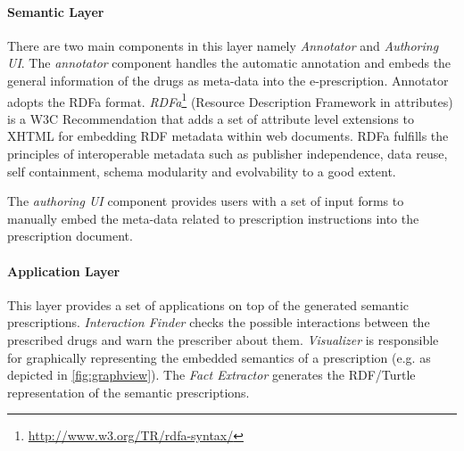 \documentclass[10pt, conference, compsocconf]{IEEEtran}
\begin{document}
\paragraph{Semantic Layer}
There are two main components in this layer namely \emph{Annotator} and \emph{Authoring UI}.
The \emph{annotator} component handles the automatic annotation and embeds the general information of the drugs as meta-data into the e-prescription.
Annotator adopts the RDFa format. \emph{RDFa}\footnote{\url{http://www.w3.org/TR/rdfa-syntax/}} (Resource Description Framework in attributes) is a W3C Recommendation that adds a set of attribute level extensions to XHTML for embedding RDF metadata within web documents.
RDFa fulfills the principles of interoperable metadata such as publisher independence, data reuse, self containment, schema modularity and evolvability to a good extent.

The \emph{authoring UI} component provides users with a set of input forms to manually embed the meta-data related to prescription instructions into the prescription document.

\paragraph{Application Layer}
This layer provides a set of applications on top of the generated semantic prescriptions.
\emph{Interaction Finder} checks the possible interactions between the prescribed drugs and warn the prescriber about them.
\emph{Visualizer} is responsible for graphically representing the embedded semantics of a prescription (e.g. as depicted in \autoref{fig:graphview}).
The \emph{Fact Extractor} generates the RDF/Turtle representation of the semantic prescriptions.
\end{document}
